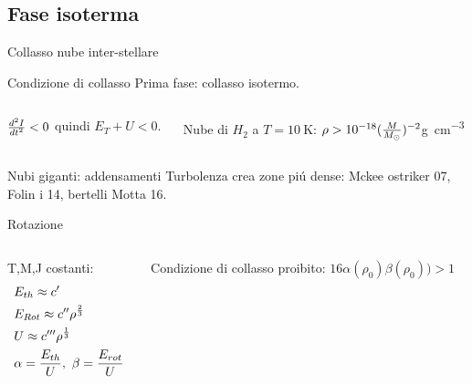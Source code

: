 \subsection{Fase isoterma}

\begin{frame}{Collasso nube inter-stellare}
\begin{block}{Condizione di collasso}
Prima fase: collasso isotermo.
\begin{columns}
\begin{column}{0.5\textwidth}
$\TtwoDy{t}{I}<0$ quindi $E_T+U<0$.
\end{column}
\begin{column}{0.5\textwidth}
Nube di $H_2$ a $T=\SI{10}{\kelvin}$:
$\rho>\num{e-18}(\frac{M}{\msun{}})^{-2}$\si{\gram\per\cubic\cm}
\end{column}
\end{columns}
\begin{block}{Nubi giganti: addensamenti}
Turbolenza crea zone pi\'u dense: Mckee ostriker 07, Folin i 14, bertelli Motta 16.
\end{block}
\begin{block}{Rotazione}
\begin{columns}[T]
\begin{column}{0.5\textwidth}
T,M,J costanti:
\begin{align*}
&E_{th}\approx c'\\
&E_{Rot}\approx c''\rho\expy{\frac{2}{3}}\\
&U\approx c'''\rho\expy{\frac{1}{3}}\\
&\alpha=\frac{E_{th}}{U},\ \beta=\frac{E_{rot}}{U}
\end{align*}
\end{column}
\begin{column}{0.5\textwidth}
Condizione di collasso proibito: $16\alpha(\rho_0)\beta(\rho_0))>1$
\end{column}
\end{columns}
\end{block}
\end{block}
\end{frame}

